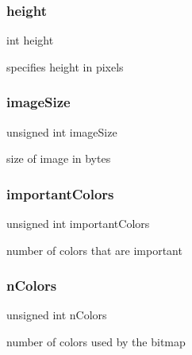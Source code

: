\hypertarget{group___bitmap_gad12fc34ce789bce6c8a05d8a17138534}{}\label{group___bitmap_gad12fc34ce789bce6c8a05d8a17138534} 
\subsubsection{\texorpdfstring{height}{height}}
{\footnotesize\ttfamily int height}



specifies height in pixels 

\hypertarget{group___bitmap_gadcd57a0168319e747bc8099218d3822c}{}\label{group___bitmap_gadcd57a0168319e747bc8099218d3822c} 
\subsubsection{\texorpdfstring{image\+Size}{imageSize}}
{\footnotesize\ttfamily unsigned int image\+Size}



size of image in bytes 

\hypertarget{group___bitmap_ga8f7abfbc446b12f385d2b42c3b4fd9b0}{}\label{group___bitmap_ga8f7abfbc446b12f385d2b42c3b4fd9b0} 
\subsubsection{\texorpdfstring{important\+Colors}{importantColors}}
{\footnotesize\ttfamily unsigned int important\+Colors}



number of colors that are important 

\hypertarget{group___bitmap_gaed4506bad904845183194f199f1bdb98}{}\label{group___bitmap_gaed4506bad904845183194f199f1bdb98} 
\subsubsection{\texorpdfstring{n\+Colors}{nColors}}
{\footnotesize\ttfamily unsigned int n\+Colors}



number of colors used by the bitmap 

\hypertarget{group___bitmap_ga29b5297d3393519050e3126c4cb07c1c}{}\label{group___bitmap_ga29b5297d3393519050e3126c4cb07c1c} 
